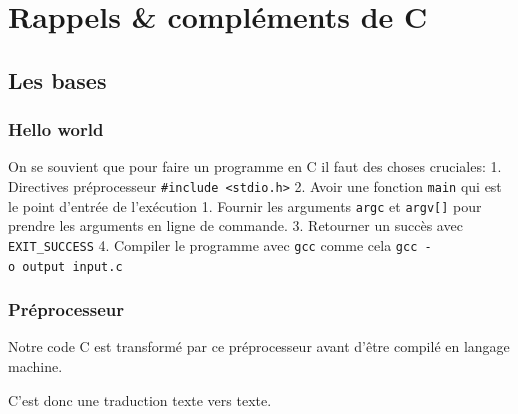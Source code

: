 \section{Rappels \& compléments de C}\label{rappels-compluxe9ments-de-c}

\subsection{Les bases}\label{les-bases}

\subsubsection{Hello world}\label{hello-world}

On se souvient que pour faire un programme en C il faut des choses
cruciales: 1. Directives préprocesseur
\texttt{\#include\ \textless{}stdio.h\textgreater{}} 2. Avoir une
fonction \texttt{main} qui est le point d'entrée de l'exécution 1.
Fournir les arguments \texttt{argc} et \texttt{argv{[}{]}} pour prendre
les arguments en ligne de commande. 3. Retourner un succès avec
\texttt{EXIT\_SUCCESS} 4. Compiler le programme avec \texttt{gcc} comme
cela \texttt{gcc\ -o\ output\ input.c}

\begin{Shaded}
\begin{Highlighting}[]

\OperatorTok{(}\OperatorTok{,} \OperatorTok{*}\OperatorTok{[])\{}
\OperatorTok{(}\OperatorTok{);}

    \OperatorTok{;}
\OperatorTok{\}}
\end{Highlighting}
\end{Shaded}

\subsubsection{Préprocesseur}\label{pruxe9processeur}

Notre code C est transformé par ce préprocesseur avant d'être compilé en
langage machine.

C'est donc une traduction texte vers texte.

